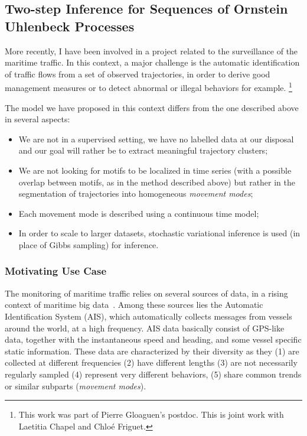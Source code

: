 \subsection{Two-step Inference for Sequences of Ornstein Uhlenbeck Processes}
\label{sec:oup}

More recently, I have been involved in a project related to the surveillance of
the maritime traffic.
In this context, a major challenge
is the automatic identification of traffic flows from a set of observed
trajectories, in order to derive good management measures or to detect abnormal
or illegal behaviors for example.%
\footnote{This work was part of Pierre Gloaguen's postdoc.
This is joint work with Laetitia Chapel and Chloé Friguet.}

The model we have proposed in this context differs from the one described above
in several aspects:

\begin{itemize}
\item We are not in a supervised setting, we have no labelled data at our disposal
and our goal will rather be to extract meaningful trajectory clusters;
\item We are not looking for motifs to be localized in time series (with
a possible overlap between motifs, as in the method described above) but rather
in the segmentation of trajectories into homogeneous \emph{movement modes};
\item Each movement mode is described using a continuous time model;
\item In order to scale to larger datasets, stochastic variational inference is used
(in place of Gibbs sampling) for inference.
\end{itemize}

\subsubsection{Motivating Use Case}

The monitoring of maritime traffic relies on several sources of data, in a
rising context of maritime big data~\cite{garnier2016exploiting}.
Among these sources lies the Automatic Identification System (AIS), which
automatically collects messages from vessels around the world, at a high
frequency.
AIS data basically consist of GPS-like data, together with the instantaneous
speed and heading, and some vessel specific static information.
These data are characterized by their diversity as they (1) are collected at
different frequencies (2) have different lengths (3) are not necessarily
regularly sampled (4) represent very different behaviors, (5) share common
trends or similar subparts (\emph{movement modes}).

